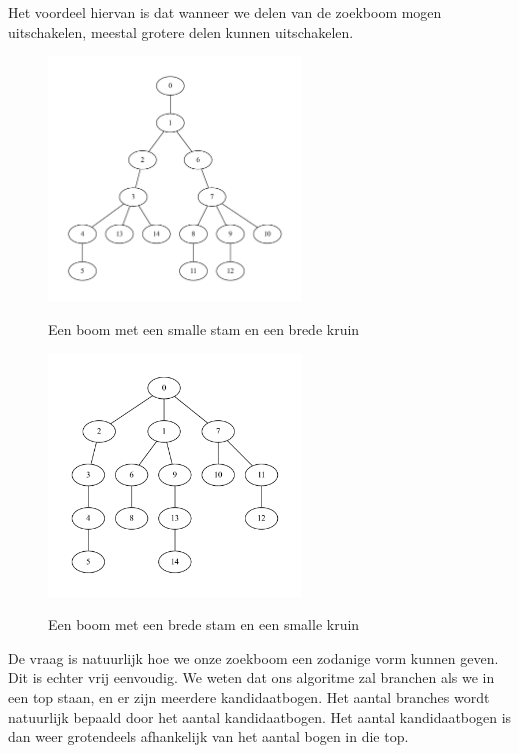 \documentclass{article}
\begin{document}
Het voordeel hiervan is dat wanneer we delen van de zoekboom mogen uitschakelen,
meestal grotere delen kunnen uitschakelen.
\newline

\begin{figure}
\begin{center}
\includegraphics[width=0.6\textwidth]{images/good-tree.pdf}
\caption{Een boom met een smalle stam en een brede kruin}
\label{fig:good-tree}
\includegraphics[width=0.6\textwidth]{images/bad-tree.pdf}
\caption{Een boom met een brede stam en een smalle kruin}
\label{fig:bad-tree}
\end{center}
\end{figure}

De vraag is natuurlijk hoe we onze zoekboom een zodanige vorm kunnen geven. Dit
is echter vrij eenvoudig. We weten dat ons algoritme zal branchen als we in een
top staan, en er zijn meerdere kandidaatbogen. Het aantal branches wordt
natuurlijk bepaald door het aantal kandidaatbogen. Het aantal kandidaatbogen is
dan weer grotendeels afhankelijk van het aantal bogen in die top.
\newline
\end{document}
